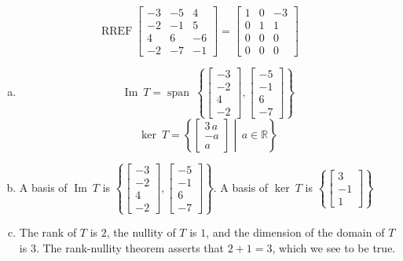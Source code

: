\begin{exerciseAnswer} 


\[\operatorname{RREF} \left[\begin{array}{ccc}
-3 & -5 & 4 \\
-2 & -1 & 5 \\
4 & 6 & -6 \\
-2 & -7 & -1
\end{array}\right] = \left[\begin{array}{ccc}
1 & 0 & -3 \\
0 & 1 & 1 \\
0 & 0 & 0 \\
0 & 0 & 0
\end{array}\right] \]


\begin{enumerate}[(a)]
\item \[\operatorname{Im}\ T = \operatorname{span}\  \left\{ \left[\begin{array}{c}
-3 \\
-2 \\
4 \\
-2
\end{array}\right] , \left[\begin{array}{c}
-5 \\
-1 \\
6 \\
-7
\end{array}\right] \right\} \]\[\operatorname{ker}\ T =  \left\{ \left[\begin{array}{c}
3 \, a \\
-a \\
a
\end{array}\right] \middle|\,a\in\mathbb{R}\right\} \]
\item  A basis of \(\operatorname{Im}\ T\) is \( \left\{ \left[\begin{array}{c}
-3 \\
-2 \\
4 \\
-2
\end{array}\right] , \left[\begin{array}{c}
-5 \\
-1 \\
6 \\
-7
\end{array}\right] \right\} \). A basis of \(\operatorname{ker}\ T\) is \( \left\{ \left[\begin{array}{c}
3 \\
-1 \\
1
\end{array}\right] \right\} \)
\item  The rank of \(T\) is \( 2 \), the nullity of \(T\) is \( 1 \), and the dimension of the domain of \(T\) is \( 3 \). The rank-nullity theorem asserts that \( 2 + 1 = 3 \), which we see to be true. 
\end{enumerate}
    
\end{exerciseAnswer}
    
